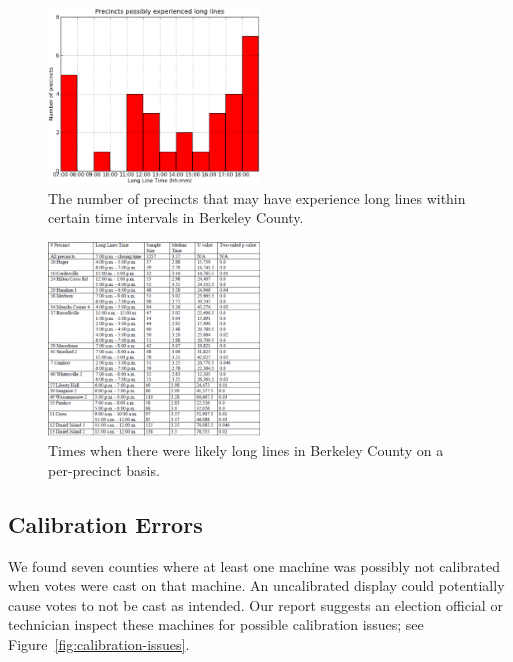 \documentclass[letterpaper,twocolumn,10pt]{article}
\begin{document}
\begin{figure}[htbp]
\begin{center}
    \includegraphics[width=0.5\textwidth,height=0.3\textheight]{berkeleyLongLine.eps}
\end{center}
\caption{The number of precincts that may have experience long lines within certain time intervals in Berkeley County.}
\label{fig:long-lines}
\end{figure}

\begin{figure}[htbp]
\begin{center}
    \includegraphics[width=0.5\textwidth,height=0.4\textheight]{berkeleyLongLineTable.eps}
\end{center}
\caption{Times when there were likely long lines in Berkeley County on a per-precinct basis.}
\label{fig:mann-whitney-u}
\end{figure}

\subsection{Calibration Errors}
 We found seven counties where at least one machine was possibly not calibrated
when votes were cast on that machine. An uncalibrated display could potentially
cause votes to not be cast as intended. Our report suggests an election official
or technician inspect these machines for possible calibration issues; see
Figure~\ref{fig:calibration-issues}.
\end{document}
